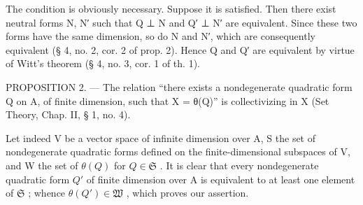 The condition is obviously necessary. Suppose it is satisfied. Then there exist neutral forms N, N′ such that Q ⊥ N and Q′ ⊥ N′ are equivalent. Since these two forms have the same dimension, so do N and N′, which are consequently equivalent (§ 4, no. 2, cor. 2 of prop. 2). Hence Q and Q′ are equivalent by virtue of Witt's theorem (§ 4, no. 3, cor. 1 of th. 1).

PROPOSITION 2. --- The relation “there exists a nondegenerate quadratic form Q on A, of finite dimension, such that X = θ(Q)” is collectivizing in X (Set Theory, Chap. II, § 1, no. 4).

Let indeed V be a vector space of infinite dimension over A, S the set of nondegenerate quadratic forms defined on the finite-dimensional subspaces of V, and W the set of \(\theta(Q)\) for \(Q \in \mathfrak{S}\) . It is clear that every nondegenerate quadratic form \(Q'\) of finite dimension over A is equivalent to at least one element of \(\mathfrak{S}\) ; whence \(\theta(Q') \in \mathfrak{W}\) , which proves our assertion.

